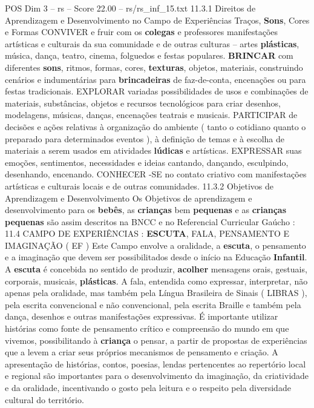 \begin{textsample}{POS Dim 3 – rs – Score 22.00 – rs/rs\_inf\_15.txt}  \label{ex:f3_pos_244}
11.3.1 Direitos de Aprendizagem e Desenvolvimento no Campo de Experiências Traços, \textbf{Sons}, Cores e Formas CONVIVER e fruir com os \textbf{colegas} e professores manifestações artísticas e culturais da sua comunidade e de outras culturas – artes \textbf{plásticas}, música, dança, teatro, cinema, folguedos e festas populares. \textbf{BRINCAR} com diferentes \textbf{sons}, ritmos, formas, cores, \textbf{texturas}, objetos, materiais, construindo cenários e indumentárias para \textbf{brincadeiras} de faz-de-conta, encenações ou para festas tradicionais.
EXPLORAR variadas possibilidades de usos e combinações de materiais, substâncias, objetos e recursos tecnológicos para criar desenhos, modelagens, músicas, danças, encenações teatrais e musicais.
PARTICIPAR de decisões e ações relativas à organização do ambiente ( tanto o cotidiano quanto o preparado para determinados eventos ), à definição de temas e à escolha de materiais a serem usados em atividades \textbf{lúdicas} e artísticas.
EXPRESSAR suas emoções, sentimentos, necessidades e ideias cantando, dançando, esculpindo, desenhando, encenando.
CONHECER -SE no contato criativo com manifestações artísticas e culturais locais e de outras comunidades. 11.3.2 Objetivos de Aprendizagem e Desenvolvimento Os Objetivos de aprendizagem e desenvolvimento para os \textbf{bebês}, as \textbf{crianças} bem \textbf{pequenas} e as \textbf{crianças} \textbf{pequenas} são assim descritos na BNCC e no Referencial Curricular Gaúcho : 11.4 CAMPO DE EXPERIÊNCIAS : \textbf{ESCUTA}, FALA, PENSAMENTO E IMAGINAÇÃO ( EF ) Este Campo envolve a oralidade, a \textbf{escuta}, o pensamento e a imaginação que devem ser possibilitados desde o início na Educação \textbf{Infantil}.
A \textbf{escuta} é concebida no sentido de produzir, \textbf{acolher} mensagens orais, gestuais, corporais, musicais, \textbf{plásticas}.
A fala, entendida como expressar, interpretar, não apenas pela oralidade, mas também pela Língua Brasileira de Sinais ( LIBRAS ), pela escrita convencional e não convencional, pela escrita Braille e também pela dança, desenhos e outras manifestações expressivas.
É importante utilizar histórias como fonte de pensamento crítico e compreensão do mundo em que vivemos, possibilitando à \textbf{criança} o pensar, a partir de propostas de experiências que a levem a criar seus próprios mecanismos de pensamento e criação.
A apresentação de histórias, contos, poesias, lendas pertencentes ao repertório local e regional são importantes para o desenvolvimento da imaginação, da criatividade e da oralidade, incentivando o gosto pela leitura e o respeito pela diversidade cultural do território.

\end{textsample}
